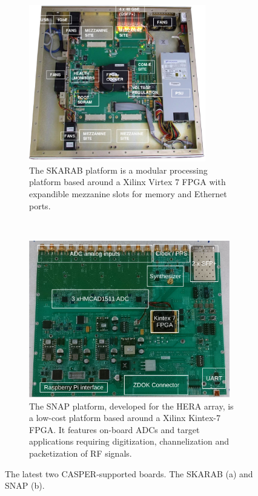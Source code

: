 \documentclass{ws-jai}
\begin{document}
\begin{figure}[t]
\centering
\begin{subfigure}[t]{0.5\textwidth}
  \centering
  \includegraphics[height=2.7in]{./figures/skarab_hw}
  \caption{The SKARAB platform is a modular processing platform based around a Xilinx Virtex 7 FPGA with expandible mezzanine slots for memory and Ethernet ports.}
  \label{fig:skarab_hw}
\end{subfigure}%
~
\begin{subfigure}[t]{0.5\textwidth}
  \centering
  \includegraphics[height=2.7in]{./figures/snap-annotated-crop.pdf}
  \caption{The SNAP platform, developed for the HERA array, is a low-cost platform based around a Xilinx Kintex-7 FPGA. It features on-board ADCs and target applications requiring digitization, channelization and packetization of RF signals.}
  \label{fig:snap_hw}
\end{subfigure}
\caption{The latest two CASPER-supported boards. The SKARAB (a) and SNAP (b).}
\label{fig:test}
\end{figure}
\end{document}
